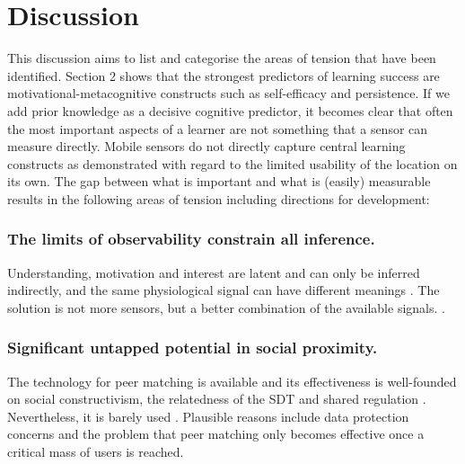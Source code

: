\documentclass[runningheads]{llncs}
\begin{document}
\section{Discussion}
This discussion aims to list and categorise the areas of tension that have been identified.
Section 2 shows that the strongest predictors of learning success are motivational-metacognitive constructs such as self-efficacy and persistence. If we add prior knowledge as a decisive cognitive predictor, it becomes clear that often the most important aspects of a learner are not something that a sensor can measure directly. Mobile sensors do not directly capture central learning constructs as demonstrated with regard to the limited usability of the location on its own.
The gap between what is important and what is (easily) measurable results in the following areas of tension including directions for development:
\subsubsection{The limits of observability constrain all inference.} Understanding, motivation and interest are latent and can only be inferred indirectly, and the same physiological signal can have different meanings \cite{di_mitri_signals_2018} \cite{hong_advances_2025}.
The solution is not more sensors, but a better combination of the available signals. \cite{giannakos_role_2023}.
\subsubsection{Significant untapped potential in social proximity.} The technology for peer matching is available and its effectiveness is well-founded on social constructivism, the relatedness of the SDT and shared regulation \cite{gumbheer_personalized_2022}.
Nevertheless, it is barely used \cite{vallejo-correa_systematic_2021}.
Plausible reasons include data protection concerns and the problem that peer matching only becomes effective once a critical mass of users is reached. %
\end{document}
